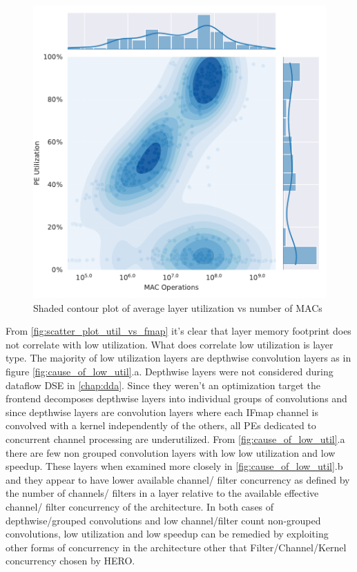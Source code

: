 \begin{figure}[ht]
    \centering
    \includegraphics[scale=0.58]{Plots/utilization/util_vs_macs.pdf}
    \caption{Shaded contour plot of average layer utilization vs number of MACs}
    \label{fig:utilization_macs_scaling}
\end{figure}

From \autoref{fig:scatter_plot_util_vs_fmap} it's clear that layer memory
footprint does not correlate with low utilization. What does correlate low
utilization is layer type. The majority of low utilization layers are depthwise
convolution layers as in figure \autoref{fig:cause_of_low_util}.a. Depthwise
layers were not considered during dataflow DSE in \autoref{chap:dda}. Since they
weren't an optimization target the frontend decomposes depthwise layers into
individual groups of convolutions and since depthwise layers are convolution
layers where each IFmap channel is convolved with a kernel independently of the
others, all PEs dedicated to concurrent channel processing are underutilized.
From \autoref{fig:cause_of_low_util}.a there are few non grouped convolution
layers with low low utilization and low speedup. These layers when examined more
closely in \autoref{fig:cause_of_low_util}.b and they appear to have lower
available channel/ filter concurrency as defined by the number of channels/
filters in a layer relative to the available effective channel/ filter
concurrency of the architecture. In both cases of depthwise/grouped convolutions
and low channel/filter count non-grouped convolutions, low utilization and low
speedup can be remedied by exploiting other forms of concurrency in the
architecture other that Filter/Channel/Kernel concurrency chosen by HERO. 

